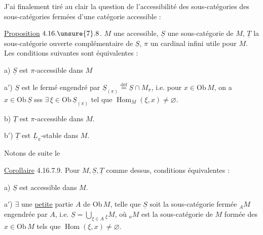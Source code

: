 

J'ai finalement tiré au clair la question de l'accessibilité des sous-catégories   des sous-catégories fermées d'une catégorie accessible :

\uline{Proposition} $4.16.\unsure{7}.8$.  $M$ une  accessible, $\underline S$ une sous-catégorie  de $M$, $\underline T$ la sous-catégorie ouverte complémentaire de $\underline S$, $\pi$ un cardinal infini utile pour $M$. Les conditions suivantes sont équivalentes :

a) $\underline S$ est $\pi$-accessible dans $M$

a$'$) $\underline S$ est le fermé engendré par $\underline S_{(\pi)}\overset{\mathrm{déf}}{=}\underline S\cap M_\pi$, i.e. pour $x\in\mathrm{Ob}\,M$, on a $x\in\mathrm{Ob}\,\underline S$ sss $\exists\,\xi\in\mathrm{Ob}\,\underline S_{(\pi)}$ tel que $\operatorname{Hom}_M(\xi,x)\ne\varnothing$.

b) $\underline T$ est $\pi$-accessible dans $M$.

b$'$) $\underline T$ est $\underline L_\pi$-stable dans $M$.

Notons  de suite le 

\uline{Corollaire} 4.16.7.9. Pour $M,\underline S,\underline T$ comme dessus, conditions équivalentes :

a) $\underline S$ est accessible dans $M$.

a$'$) $\exists$ une \uline{petite} partie $A$ de $\mathrm{Ob}\,M$, telle que $\underline S$ soit la sous-catégorie fermée $ {}_A M$ engendrée par $A$, i.e. $\underline S=\bigcup_{\xi\in A}{}_\xi M$, où $ {}_a M$ est  la sous-catégorie  de $M$ formée des $x\in\mathrm{Ob}\,M$ tels que $\operatorname{Hom}(\xi,x)\ne\varnothing$.

